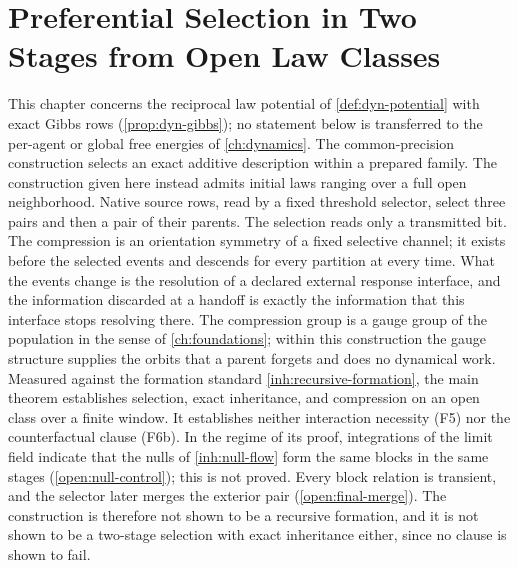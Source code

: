 \chapter{Preferential Selection in Two Stages from Open Law Classes}
\label{ch:open-formation}

This chapter concerns the reciprocal law potential of \cref{def:dyn-potential} with exact Gibbs rows (\cref{prop:dyn-gibbs}); no statement below is transferred to the per-agent or global free energies of \cref{ch:dynamics}. The common-precision construction selects an exact additive description within a prepared family. The construction given here instead admits initial laws ranging over a full open neighborhood. Native source rows, read by a fixed threshold selector, select three pairs and then a pair of their parents. The selection reads only a transmitted bit. The compression is an orientation symmetry of a fixed selective channel; it exists before the selected events and descends for every partition at every time. What the events change is the resolution of a declared external response interface, and the information discarded at a handoff is exactly the information that this interface stops resolving there. The compression group is a gauge group of the population in the sense of \cref{ch:foundations}; within this construction the gauge structure supplies the orbits that a parent forgets and does no dynamical work. Measured against the formation standard \cref{inh:recursive-formation}, the main theorem establishes selection, exact inheritance, and compression on an open class over a finite window. It establishes neither interaction necessity (F5) nor the counterfactual clause (F6b). In the regime of its proof, integrations of the limit field indicate that the nulls of \cref{inh:null-flow} form the same blocks in the same stages (\cref{open:null-control}); this is not proved. Every block relation is transient, and the selector later merges the exterior pair (\cref{open:final-merge}). The construction is therefore not shown to be a recursive formation, and it is not shown to be a two-stage selection with exact inheritance either, since no clause is shown to fail.


